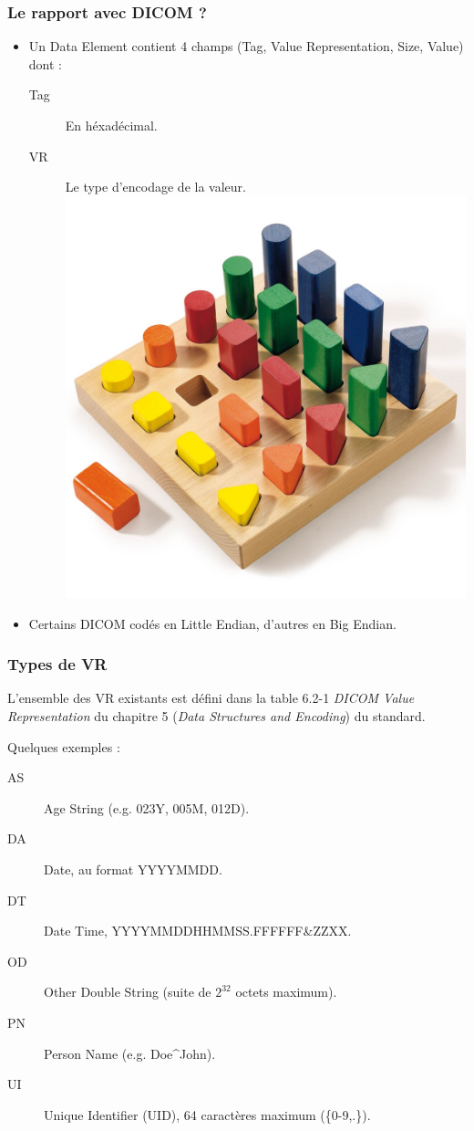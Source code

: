 \frame
{
    \frametitle{Le rapport avec DICOM ?}
    \begin{itemize}
        \item Un Data Element contient 4 champs (Tag, Value Representation, Size, Value) dont :
        \begin{description}
            \item[Tag] En h\'exad\'ecimal.
            \item[VR] Le type d'encodage de la valeur.\\
                \includegraphics[width=.5\linewidth]{./figures/types.jpg}
        \end{description}
        \item Certains DICOM cod\'es en Little Endian, d'autres en Big Endian. 
    \end{itemize}
}

\frame
{
    \frametitle{Types de VR}
    L'ensemble des VR existants est d\'efini dans la table 6.2-1 \emph{DICOM Value Representation} du chapitre 5 (\emph{Data Structures and Encoding}) du standard.

    Quelques exemples :
    \begin{description}
        \item[AS] Age String (e.g. 023Y, 005M, 012D).
        \item[DA] Date, au format YYYYMMDD.
        \item[DT] Date Time, YYYYMMDDHHMMSS.FFFFFF\&{}ZZXX.
        \item[OD] Other Double String (suite de $2^{32}$ octets maximum).
        \item[PN] Person Name (e.g. Doe\^{}John).
        \item[UI] Unique Identifier (UID), 64 caract\`eres maximum (\{0-9,.\}).
    \end{description}
}


